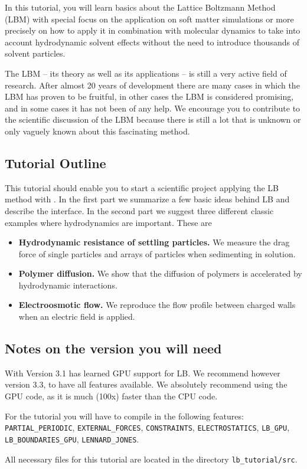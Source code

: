 In this tutorial, you will learn basics about the 
Lattice Boltzmann Method (LBM) with special focus on the application
on soft matter simulations or more precisely on how to apply it 
in combination with molecular dynamics to take into account 
hydrodynamic solvent effects without the need to introduce
thousands of solvent particles. 

The LBM -- its theory as well as its applications -- is 
still a very active field of research. After almost 20 years
of development there are many cases in which the LBM has proven
to be fruitful, in other cases the LBM is considered promising,
and in some cases it has not been of any help. We
encourage you to contribute to the scientific discussion 
of the LBM because there is still a lot 
that is unknown or only vaguely known about this fascinating
method. 

\subsection*{Tutorial Outline}
This tutorial should enable you to start a scientific project applying
the LB method with \ES{}. In the first part we summarize a few basic ideas behind LB 
and describe the interface. In the second part we suggest three
different classic examples where hydrodynamics are important. These are
\begin{itemize}
  \item {\bf Hydrodynamic resistance of settling particles.} We measure the drag
   force of single particles and arrays of particles when sedimenting
   in solution.
  \item {\bf Polymer diffusion.} We show that the diffusion of polymers is accelerated 
    by hydrodynamic interactions. 
  \item {\bf Electroosmotic flow.} We reproduce the flow profile  
  between charged walls when an electric field is applied. 
\end{itemize}

\subsection*{Notes on the \ES{} version you will need}
With Version 3.1 \ES{} has learned GPU support for LB. We recommend however
version 3.3, to have all features available. We absolutely recommend using 
the GPU code, as it is much (100x) faster than the CPU code.

For the tutorial you will have to compile in the following  features:
{\tt PARTIAL\_PERIODIC}, {\tt EXTERNAL\_FORCES}, {\tt CONSTRAINTS}, {\tt ELECTROSTATICS}, 
{\tt LB\_GPU}, {\tt LB\_BOUNDARIES\_GPU},  {\tt LENNARD\_JONES}.

All necessary files for this tutorial are located in the directory {\tt lb\_tutorial/src}.
\pagebreak


